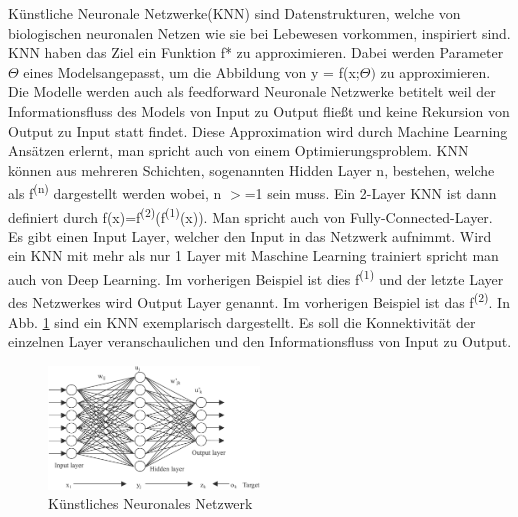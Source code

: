 \documentclass{llncs}
\begin{document}
Künstliche Neuronale Netzwerke(KNN) sind Datenstrukturen, welche von biologischen neuronalen Netzen wie sie bei Lebewesen vorkommen, inspiriert sind. KNN haben das Ziel ein Funktion f* zu approximieren. Dabei werden Parameter $\Theta$ eines Modelsangepasst, um die Abbildung von y = f(x;$\Theta)$ zu approximieren. Die Modelle werden auch als feedforward Neuronale Netzwerke betitelt weil der Informationsfluss des Models von Input zu Output fließt und keine Rekursion von Output zu Input statt findet. Diese Approximation wird durch Machine Learning Ansätzen erlernt, man spricht auch von einem Optimierungsproblem. KNN können aus mehreren Schichten, sogenannten Hidden Layer n, bestehen, welche als f\textsuperscript{(n)} dargestellt werden wobei, n $>$=1 sein muss. Ein 2-Layer KNN ist dann definiert durch f(x)=f\textsuperscript{(2)}(f\textsuperscript{(1)}(x)). Man spricht auch von Fully-Connected-Layer. Es gibt einen Input Layer, welcher den Input in das Netzwerk aufnimmt\cite{Grundlagen}. Wird ein KNN mit mehr als nur 1 Layer mit Maschine Learning trainiert spricht man auch von Deep Learning. Im vorherigen Beispiel ist dies f\textsuperscript{(1)} und der letzte Layer des Netzwerkes wird Output Layer genannt. Im vorherigen Beispiel ist das f\textsuperscript{(2)}. In Abb. \ref{fig:Bild1} sind ein KNN exemplarisch dargestellt. Es soll die Konnektivität der einzelnen Layer veranschaulichen und den Informationsfluss von Input zu Output. 

\begin{figure}[htbp]
	\centering
	\includegraphics[width=0.5\textwidth]{neuronalesnetzwerk.png}
	\caption{Künstliches Neuronales Netzwerk\protect\cite{annpic}}
	\label{fig:Bild1}
\end{figure}
\end{document}
